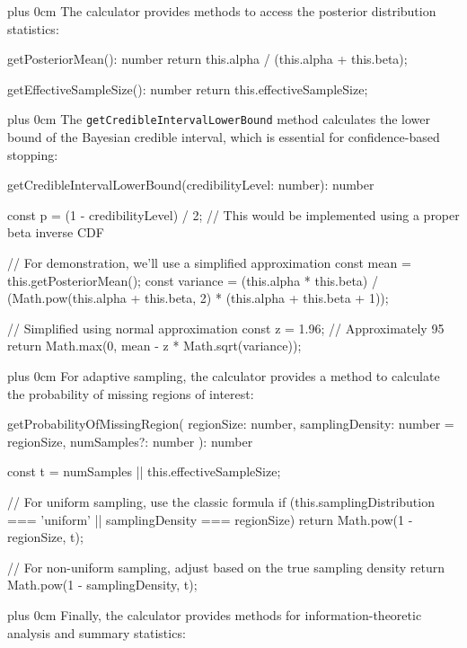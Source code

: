 \documentclass[conference]{IEEEtran}
\newcommand{\justifytext}{\leftskip=0pt \rightskip=0pt plus 0cm}
\begin{document}
\justifytext
The calculator provides methods to access the posterior distribution statistics:

\begin{wrappedcode}
  getPosteriorMean(): number {
    return this.alpha / (this.alpha + this.beta);
  }
  
  getEffectiveSampleSize(): number {
    return this.effectiveSampleSize;
  }
\end{wrappedcode}

\justifytext
The \texttt{getCredibleIntervalLowerBound} method calculates the lower bound of the Bayesian credible interval, which is essential for confidence-based stopping:

\begin{wrappedcode}
  getCredibleIntervalLowerBound(credibilityLevel: number): number {
    const p = (1 - credibilityLevel) / 2;
    // This would be implemented using a proper beta inverse CDF
    
    // For demonstration, we'll use a simplified approximation
    const mean = this.getPosteriorMean();
    const variance = (this.alpha * this.beta) / 
      (Math.pow(this.alpha + this.beta, 2) * (this.alpha + this.beta + 1));
    
    // Simplified using normal approximation
    const z = 1.96; // Approximately 95%
    return Math.max(0, mean - z * Math.sqrt(variance));
  }
\end{wrappedcode}

\justifytext
For adaptive sampling, the calculator provides a method to calculate the probability of missing regions of interest:

\begin{wrappedcode}
  getProbabilityOfMissingRegion(
    regionSize: number, 
    samplingDensity: number = regionSize, 
    numSamples?: number
  ): number {
    const t = numSamples || this.effectiveSampleSize;
    
    // For uniform sampling, use the classic formula
    if (this.samplingDistribution === 'uniform' || samplingDensity === regionSize) {
      return Math.pow(1 - regionSize, t);
    }
    
    // For non-uniform sampling, adjust based on the true sampling density
    return Math.pow(1 - samplingDensity, t);
  }
\end{wrappedcode}

\justifytext
Finally, the calculator provides methods for information-theoretic analysis and summary statistics:
\end{document}
